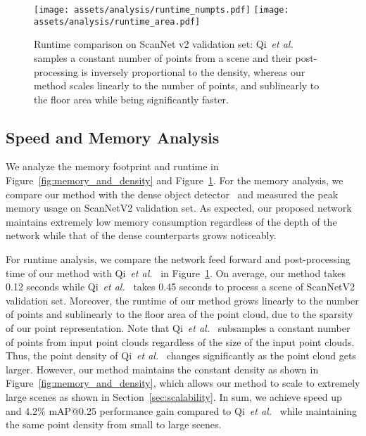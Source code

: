 \documentclass[runningheads]{llncs}
\newcommand{\etal}{\textit{et al.}}
\begin{document}
 \begin{figure}[t]
    \centering
    \texttt{[image: assets/analysis/runtime\_numpts.pdf]}
    \texttt{[image: assets/analysis/runtime\_area.pdf]}
    \vspace{-0.5em}
    \caption{Runtime comparison on ScanNet v2 validation set: Qi~\etal~\cite{qi2019deep} samples a constant number of points from a scene and their post-processing is inversely proportional to the density, whereas our method scales linearly to the number of points, and sublinearly to the floor area while being significantly faster.}
    \label{fig:scannet_runtime}
\end{figure} \subsection{Speed and Memory Analysis}
\label{sec:analysis}

We analyze the memory footprint and runtime in Figure~\ref{fig:memory_and_density} and Figure~\ref{fig:scannet_runtime}. For the memory analysis, we compare our method with the dense object detector~\cite{hou20193d} and measured the peak memory usage on ScanNetV2 validation set. As expected, our proposed network maintains extremely low memory consumption regardless of the depth of the network while that of the dense counterparts grows noticeably.


For runtime analysis, we compare the network feed forward and post-processing time of our method with Qi~\etal~\cite{qi2019deep} in Figure~\ref{fig:scannet_runtime}. On average, our method takes 0.12 seconds while Qi~\etal~\cite{qi2019deep} takes 0.45 seconds to process a scene of ScanNetV2 validation set. Moreover, the runtime of our method grows linearly to the number of points and sublinearly to the floor area of the point cloud, due to the sparsity of our point representation.
Note that Qi~\etal~\cite{qi2019deep} subsamples a constant number of points from input point clouds regardless of the size of the input point clouds.
Thus, the point density of Qi~\etal~\cite{qi2019deep} changes significantly as the point cloud gets larger.
However, our method maintains the constant density as shown in Figure~\ref{fig:memory_and_density}, which allows our method to scale to extremely large scenes as shown in Section~\ref{sec:scalability}.
In sum, we achieve  speed up and 4.2\% mAP@0.25 performance gain compared to Qi~\etal~\cite{qi2019deep} while maintaining the same point density from small to large scenes.
 
\end{document}
